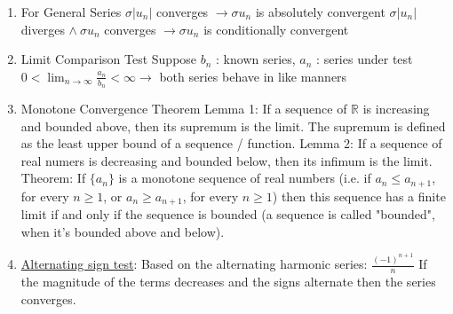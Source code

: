 \documentclass[12pt]{article}
\begin{document}
\begin{flushleft}
\begin{enumerate}
	\item For General Series \linebreak 
		\textbullet \quad $\sigma |u_n| $ converges $ \longrightarrow \sigma u_n $ is absolutely convergent \linebreak 
		\textbullet \quad $\sigma |u_n| $ diverges $ \land \ \sigma u_n $ converges $\longrightarrow \sigma u_n $ is conditionally convergent \linebreak 
		
	\item Limit Comparison Test \linebreak 
	\textbullet \quad Suppose $b_n$  :  known series, $a_n$  :  series under test \linebreak 
	$0 < \lim_{n\to\infty} \frac{a_n}{b_n} < \infty \longrightarrow $ both series behave in like manners \linebreak 	 
	 
	\item Monotone Convergence Theorem \linebreak 
	\textbullet \quad Lemma 1: If a sequence of $ \mathbb{R}$ is increasing and bounded above, then its supremum is the limit. The supremum is defined as the least upper bound of a sequence / function. \linebreak 
	\textbullet \quad Lemma 2: If a sequence of real numers is decreasing and bounded below, then its infimum is the limit. \linebreak 
	\textbullet \quad Theorem: If $\{a_n\} $ is a monotone sequence of real numbers (i.e. if $a_n \leq a_{n+1}$, for every $n\geq 1$, or $a_n \geq a_{n+1}$, for every $n\geq 1$) then this sequence has a finite limit if and only if the sequence is bounded (a sequence is called "bounded", when it's bounded above and below). \linebreak 
	
	\item \uline{Alternating sign test}: Based on the alternating harmonic series: $\frac{(-1)^{n+1}}{n}$ If the magnitude of the terms decreases and the signs alternate then the series converges.  
	\end{enumerate}
	

\end{flushleft}
\end{document}
